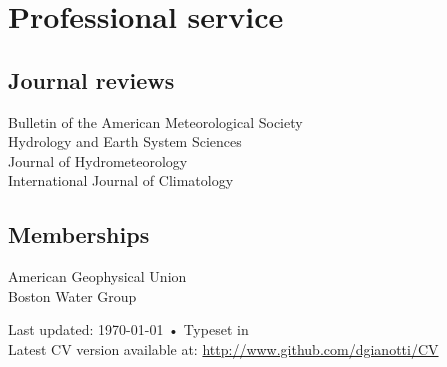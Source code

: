 \documentclass[10pt, a4paper]{article}
\begin{document}
\section*{Professional service}

\subsection*{Journal reviews}
Bulletin of the American Meteorological Society\\
Hydrology and Earth System Sciences\\
Journal of Hydrometeorology\\
International Journal of Climatology

\subsection*{Memberships}
American Geophysical Union\\ %
Boston Water Group %

\vfill{}

\begin{center}
{\scriptsize  Last updated: \today\- •\- 
Typeset in \href{http://nitens.org/taraborelli/cvtex}{
\XeTeX }\\
Latest CV version available at: \href{http://www.github.com/dgianotti/CV}{http://www.github.com/dgianotti/CV}}
\end{center}
\end{document}
